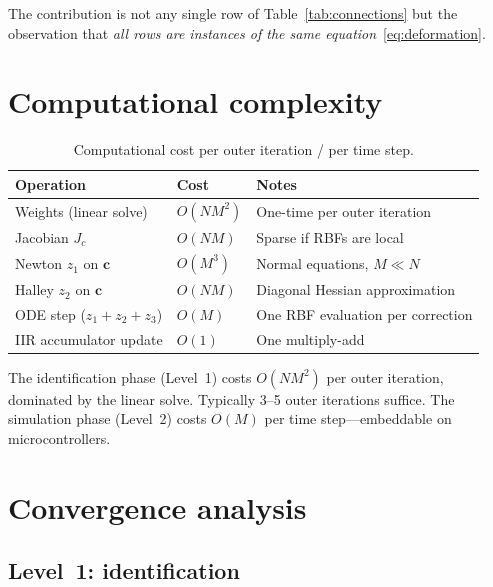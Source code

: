 \documentclass[11pt,a4paper]{article}
\begin{document}
The contribution is not any single row of Table~\ref{tab:connections} but the observation that \emph{all rows are instances of the same equation}~\eqref{eq:deformation}.


\section{Computational complexity}
\label{sec:complexity}

\begin{table}[H]
\centering
\caption{Computational cost per outer iteration / per time step.}
\label{tab:complexity}
\begin{tabular}{L{4.5cm} C{2.5cm} L{4.5cm}}
\toprule
\textbf{Operation} & \textbf{Cost} & \textbf{Notes} \\
\midrule
Weights (linear solve) & $O(NM^2)$ & One-time per outer iteration \\
Jacobian $J_c$ & $O(NM)$ & Sparse if RBFs are local \\
Newton $z_1$ on $\mathbf{c}$ & $O(M^3)$ & Normal equations, $M \ll N$ \\
Halley $z_2$ on $\mathbf{c}$ & $O(NM)$ & Diagonal Hessian approximation \\
ODE step ($z_1 + z_2 + z_3$) & $O(M)$ & One RBF evaluation per correction \\
IIR accumulator update & $O(1)$ & One multiply-add \\
\bottomrule
\end{tabular}
\end{table}

The identification phase (Level~1) costs $O(NM^2)$ per outer iteration, dominated by the linear solve. Typically 3--5 outer iterations suffice. The simulation phase (Level~2) costs $O(M)$ per time step---embeddable on microcontrollers.


\section{Convergence analysis}
\label{sec:convergence}

\subsection{Level~1: identification}
\end{document}
